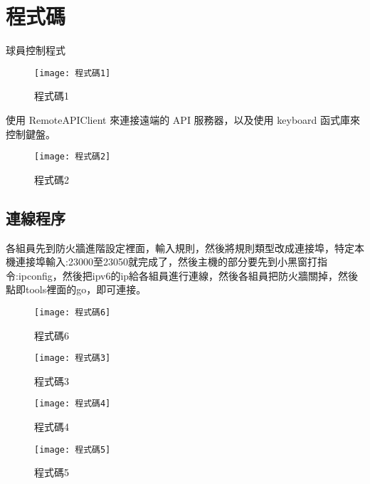 \chapter{程式碼}
 球員控制程式\\
 
 \begin{figure}[hbt!]
\begin{center}
\texttt{[image: 程式碼1]}
\caption{\Large 程式碼1}\label{fig.程式碼1}
\end{center}
\end{figure}

 使用 RemoteAPIClient 來連接遠端的 API 服務器，以及使用
keyboard 函式庫來控制鍵盤。\\
\begin{figure}[hbt!]
\begin{center}
\texttt{[image: 程式碼2]}
\caption{\Large 程式碼2}\label{fig.程式碼2}
\end{center}
\end{figure}
\newpage
 
\section{連線程序}
各組員先到防火牆進階設定裡面，輸入規則，然後將規則類型改成連接埠，特定本機連接埠輸入:23000至23050就完成了，然後主機的部分要先到小黑窗打指令:ipconfig，然後把ipv6的ip給各組員進行連線，然後各組員把防火牆關掉，然後點即tools裡面的go，即可連接。\\
\begin{figure}[hbt!]
\begin{center}
\texttt{[image: 程式碼6]}
\caption{\Large 程式碼6}\label{fig.程式碼6}
\end{center}
\end{figure}

\begin{figure}[hbt!]
\begin{center}
\texttt{[image: 程式碼3]}
\caption{\Large 程式碼3}\label{fig.程式碼3}
\end{center}
\end{figure}
\newpage

\begin{figure}[hbt!]
\begin{center}
\texttt{[image: 程式碼4]}
\caption{\Large 程式碼4}\label{fig.程式碼4}
\end{center}
\end{figure}

\begin{figure}[hbt!]
\begin{center}
\texttt{[image: 程式碼5]}
\caption{\Large 程式碼5}\label{fig.程式碼5}
\end{center}
\end{figure}
\newpage